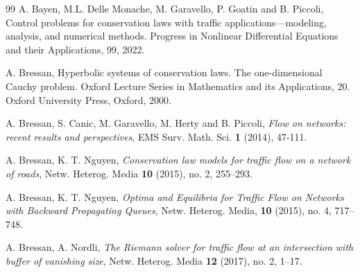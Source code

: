\documentclass[a4paper, 10pt, final]{article}
\begin{document}
\begin{thebibliography}{99}
 A. Bayen, M.L. Delle Monache, M. Garavello, P. Goatin and B. Piccoli, Control problems for conservation laws with traffic applications—modeling, analysis, and numerical methods. 
Progress in Nonlinear Differential Equations and their Applications, 99, 2022.

 A. Bressan, Hyperbolic systems of conservation
  laws.  The one-dimensional Cauchy problem. Oxford Lecture Series in
  Mathematics and its Applications, 20. Oxford University Press,
  Oxford, 2000.   

  A. Bressan, S. Canic, M. Garavello, M. Herty and B. Piccoli, 
 \textsl{Flow on networks: recent results and perspectives},
EMS Surv. Math. Sci. \textbf{1} (2014), 47-111.

%
%


 A. Bressan, K. T. Nguyen, 
 \textsl{Conservation law models for traffic flow on a network of roads}, 
Netw. Heterog. Media \textbf{10}  (2015), no. 2, 255--293. 

 A. Bressan, K. T. Nguyen, 
\textsl{Optima and Equilibria for Traffic Flow on Networks with Backward Propagating Queues}, Netw. Heterog. Media, 
 \textbf{10}  (2015), no. 4, 717--748. 
 
 A. Bressan, A. Nordli, 
 \textsl{The Riemann solver for traffic flow at an
intersection with buffer of vanishing size}, 
Netw. Heterog. Media \textbf{12}  (2017), no. 2, 1--17. 

 

%


\end{thebibliography}
\end{document}
